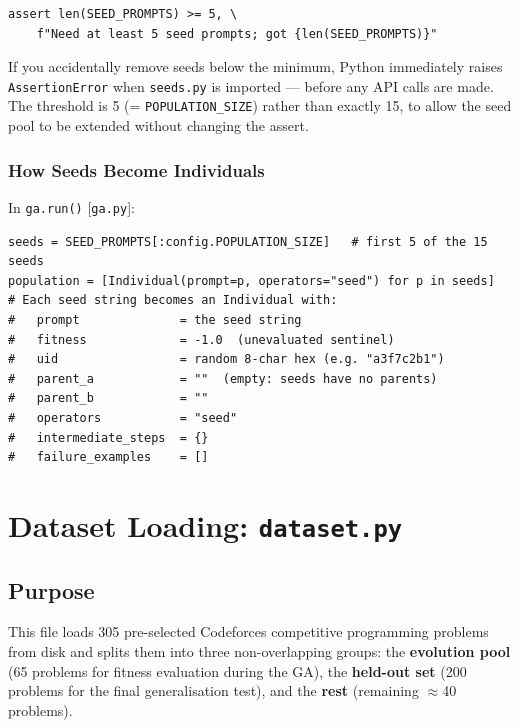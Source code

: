 \documentclass[11pt,a4paper]{report}
\newcommand{\pyfile}[1]{\texttt{#1}}
\newcommand{\fn}[1]{\texttt{#1}}
\begin{document}
\begin{lstlisting}[style=example]
assert len(SEED_PROMPTS) >= 5, \
    f"Need at least 5 seed prompts; got {len(SEED_PROMPTS)}"
\end{lstlisting}

If you accidentally remove seeds below the minimum, Python immediately raises
\texttt{AssertionError} when \pyfile{seeds.py} is imported --- before any API calls are made.
The threshold is 5 (= \fn{POPULATION\_SIZE}) rather than exactly 15, to allow the seed
pool to be extended without changing the assert.

\subsection{How Seeds Become Individuals}

In \fn{ga.run()} [\pyfile{ga.py}]:
\begin{lstlisting}[style=example]
seeds = SEED_PROMPTS[:config.POPULATION_SIZE]   # first 5 of the 15 seeds
population = [Individual(prompt=p, operators="seed") for p in seeds]
# Each seed string becomes an Individual with:
#   prompt              = the seed string
#   fitness             = -1.0  (unevaluated sentinel)
#   uid                 = random 8-char hex (e.g. "a3f7c2b1")
#   parent_a            = ""  (empty: seeds have no parents)
#   parent_b            = ""
#   operators           = "seed"
#   intermediate_steps  = {}
#   failure_examples    = []
\end{lstlisting}


\chapter{Dataset Loading: \pyfile{dataset.py}}

\section{Purpose}

This file loads 305 pre-selected Codeforces competitive programming problems from disk
and splits them into three non-overlapping groups: the \textbf{evolution pool} (65
problems for fitness evaluation during the GA), the \textbf{held-out set} (200 problems
for the final generalisation test), and the \textbf{rest} (remaining $\approx$40 problems).
\end{document}
